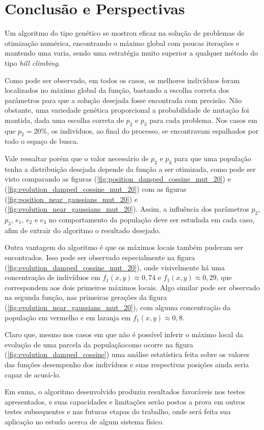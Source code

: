 \chapter{Conclusão e Perspectivas}\label{cap_conclusao}

Um algoritmo do tipo genético se mostrou eficaz na solução de problemas de otimização
numérica, encontrando o máximo global com poucas iterações e mantendo uma varia, sendo uma
estratégia muito superior a qualquer método do tipo \textit{hill climbing}. 

Como pode ser observado, em todos os casos, os melhores indivíduos foram localizados no máximo global
da função, bastando a escolha correta dos parâmetros para que a solução desejada
fosse encontrada com precisão. Não obstante, uma variedade genética proporcional a
probabilidade de mutação foi mantida, dada uma escolha correta de $p_2$ e $p_3$ para cada
problema. Nos casos em que $p_2 = 20\%$, os indivíduos, ao final do processo, se encontravam
espalhados por todo o espaço de busca. 

Vale ressaltar porém que o valor necessário de $p_2$ e $p_3$ para que uma população 
tenha a distribuição desejada depende da função a ser otimizada, como pode ser visto
comparando as figuras (\ref{fig:position_damped_cossine_mut_20}) e (\ref{fig:evolution_damped_cossine_mut_20})
com as figuras (\ref{fig:position_near_gaussians_mut_20}) e (\ref{fig:evolution_near_gaussians_mut_20}).
Assim, a influência dos parâmetros $p_2$, $p_3$, $e_1$, $e_2$ e $e_3$ no comportamento da população
deve ser estudada em cada caso, afim de extrair do algoritmo o resultado desejado.

Outra vantagem do algoritmo é que os máximos locais também puderam ser encontrados.
Isso pode ser observado especialmente na figura (\ref{fig:evolution_damped_cossine_mut_20}),
onde visivelmente há uma concentração de indivíduos em $ f_1(x,y) \approx 0,74 $ e 
$ f_1(x,y) \approx 0,29 $, que correspondem aos dois primeiros máximos locais.
Algo similar pode ser observado na segunda função, nas primeiras gerações da figura 
(\ref{fig:evolution_near_gaussians_mut_20}), com alguma concentração da população em
vermelho e em laranja em $f_1(x,y) \approx 0,8$.

Claro que, mesmo nos casos em que não é possível inferir o máximo local da evolução
de uma parcela da população\trav como ocorre na figura (\ref{fig:evolution_damped_cossine})\trav
uma análise estatística feita sobre os valores das funções desempenho dos indivíduos e
suas respectivas posições ainda seria capaz de acusá-lo.

Em suma, o algoritmo desenvolvido produziu resultados favoráveis nos testes apresentados, e suas capacidades
e limitações serão postos a prova em outros testes subsequentes e nas futuras etapas do trabalho, 
onde será feita sua aplicação no estudo acerca de algum sistema físico.

\nocite{charbonneau2002ga}